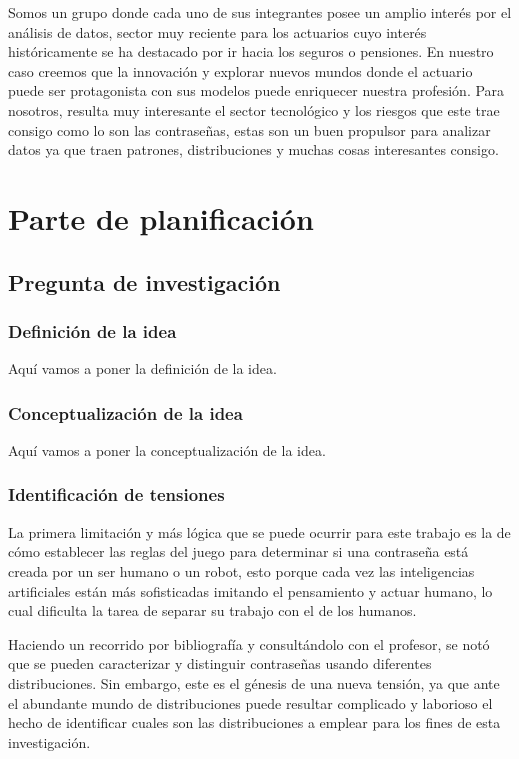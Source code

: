 \documentclass[
  10pt,
  letterpaper,
  12pt,
  oneside]{book}
\begin{document}
Somos un grupo donde cada uno de sus integrantes posee un amplio interés
por el análisis de datos, sector muy reciente para los actuarios cuyo
interés históricamente se ha destacado por ir hacia los seguros o
pensiones. En nuestro caso creemos que la innovación y explorar nuevos
mundos donde el actuario puede ser protagonista con sus modelos puede
enriquecer nuestra profesión. Para nosotros, resulta muy interesante el
sector tecnológico y los riesgos que este trae consigo como lo son las
contraseñas, estas son un buen propulsor para analizar datos ya que
traen patrones, distribuciones y muchas cosas interesantes consigo.

\chapter*{Parte de planificación}

\section {Pregunta de investigación}
\subsection{Definición de la idea}

Aquí vamos a poner la definición de la idea.

\subsection{Conceptualización de la idea}

Aquí vamos a poner la conceptualización de la idea.

\subsection{Identificación de tensiones}

La primera limitación y más lógica que se puede ocurrir para este
trabajo es la de cómo establecer las reglas del juego para determinar si
una contraseña está creada por un ser humano o un robot, esto porque
cada vez las inteligencias artificiales están más sofisticadas imitando
el pensamiento y actuar humano, lo cual dificulta la tarea de separar su
trabajo con el de los humanos.

Haciendo un recorrido por bibliografía y consultándolo con el profesor,
se notó que se pueden caracterizar y distinguir contraseñas usando
diferentes distribuciones. Sin embargo, este es el génesis de una nueva
tensión, ya que ante el abundante mundo de distribuciones puede resultar
complicado y laborioso el hecho de identificar cuales son las
distribuciones a emplear para los fines de esta investigación.
\end{document}
